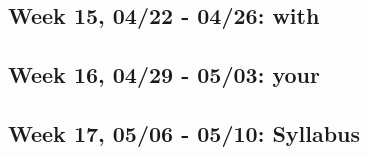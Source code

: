 \documentclass[11pt,]{article}
\begin{document}
\hypertarget{week-15-0422---0426-with}{%
\subsection{Week 15, 04/22 - 04/26:
with}\label{week-15-0422---0426-with}}

\hypertarget{week-16-0429---0503-your}{%
\subsection{Week 16, 04/29 - 05/03:
your}\label{week-16-0429---0503-your}}

\hypertarget{week-17-0506---0510-syllabus}{%
\subsection{Week 17, 05/06 - 05/10:
Syllabus}\label{week-17-0506---0510-syllabus}}
\end{document}
